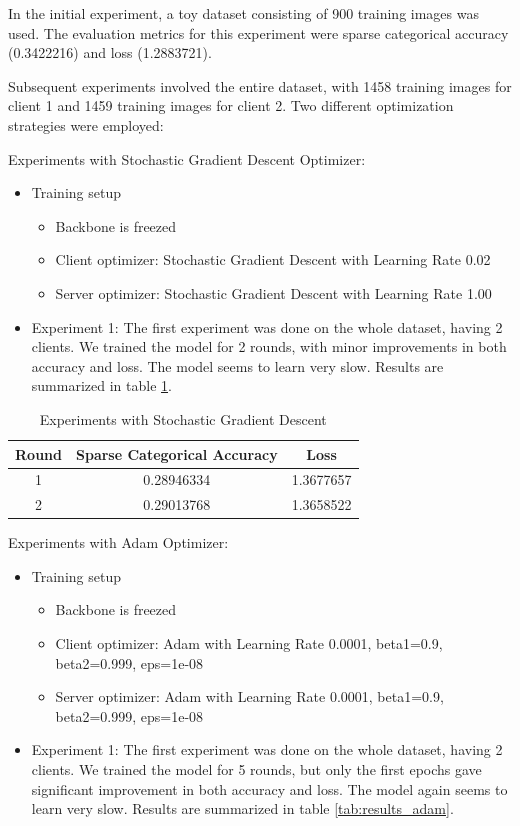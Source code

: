 \documentclass[runningheads,a4paper,11pt]{report}
\begin{document}
In the initial experiment, a toy dataset consisting of 900 training images was used. The evaluation metrics for this experiment were sparse categorical accuracy (0.3422216) and loss (1.2883721).

Subsequent experiments involved the entire dataset, with 1458 training images for client 1 and 1459 training images for client 2. Two different optimization strategies were employed:

Experiments with Stochastic Gradient Descent Optimizer:
\begin{itemize}
\item Training setup
\begin{itemize}
    \item Backbone is freezed 
    \item Client optimizer: Stochastic Gradient Descent with Learning Rate 0.02
    \item Server optimizer: Stochastic Gradient Descent with Learning Rate 1.00
\end{itemize}
\item Experiment 1: The first experiment was done on the whole dataset, having 2 clients. We trained the model for 2 rounds, with minor  improvements in both accuracy and loss. The model seems to learn very slow. Results are summarized in table \ref{tab:results_sgd}.
\end{itemize}

\begin{table}[h!tb]
\centering
\begin{tabular}{|c|c|c|}
\hline
\textbf{Round} & \textbf{Sparse Categorical Accuracy} & \textbf{Loss} \\
\hline
1 & 0.28946334 & 1.3677657 \\
\hline
2 & 0.29013768 & 1.3658522 \\
\hline
\end{tabular}
\caption{Experiments with Stochastic Gradient Descent}
\label{tab:results_sgd}
\end{table}


Experiments with Adam Optimizer:
\begin{itemize}
\item Training setup
\begin{itemize}
    \item Backbone is freezed 
    \item Client optimizer: Adam with Learning Rate 0.0001, beta1=0.9, beta2=0.999, eps=1e-08
    \item Server optimizer: Adam with Learning Rate 0.0001, beta1=0.9, beta2=0.999, eps=1e-08
\end{itemize}

\item Experiment 1: The first experiment was done on the whole dataset, having 2 clients. We trained the model for 5 rounds, but only the first epochs gave significant improvement in both accuracy and loss. The model again seems to learn very slow. Results are summarized in table \ref{tab:results_adam}.
\end{itemize}
\end{document}
